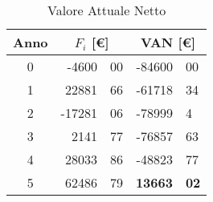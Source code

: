\begin{table}[!h]
\centering
\begin{tabular}{c|r@{.}l|r@{.}l}
Anno
& \multicolumn{2}{|c}{$F_i$ [\euro]}
& \multicolumn{2}{|c}{VAN [\euro]}
\\          
\hline
0 &  -4600&00  & -84600&00 \\
1 &  22881&66  & -61718&34 \\ 
2 & -17281&06  & -78999&4  \\
3 &   2141&77  & -76857&63 \\
4 &  28033&86  & -48823&77 \\
5 &  62486&79  &  \textbf{13663}&\textbf{02} 
\end{tabular}
\caption{Valore Attuale Netto}
\label{tab:van}
\end{table}
